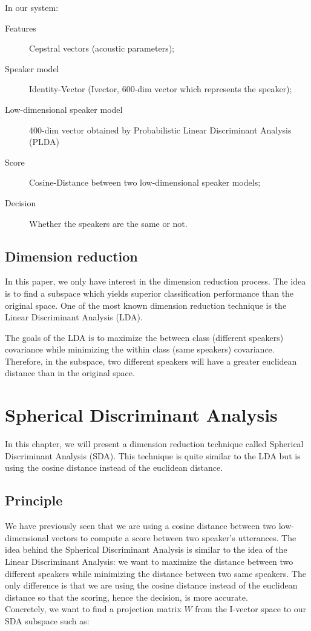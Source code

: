 \documentclass{techrep} %
\begin{document}
In our system:
\begin{description}
\item[Features] Cepstral vectors (acoustic parameters);
\item[Speaker model] Identity-Vector (Ivector, 600-dim vector which
  represents the speaker);
\item[Low-dimensional speaker model] 400-dim vector obtained by
  Probabilistic Linear Discriminant Analysis (PLDA)
\item[Score] Cosine-Distance between two low-dimensional speaker models;
\item[Decision] Whether the speakers are the same or not.
\end{description}

\section{Dimension reduction}

In this paper, we only have interest in the dimension reduction
process. The idea is to find a subspace which yields superior
classification performance than the original space. One of the most
known dimension reduction technique is the Linear Discriminant
Analysis (LDA).

The goals of the LDA is to maximize the between class (different
speakers) covariance while minimizing the within class (same speakers)
covariance. Therefore, in the subspace, two different speakers will
have a greater euclidean distance than in the original space.

\chapter{Spherical Discriminant Analysis}

In this chapter, we will present a dimension reduction technique
called Spherical Discriminant Analysis (SDA). This technique is quite
similar to the LDA but is using the cosine distance instead of the
euclidean distance.

\newcommand{\argmax}[1]{\smash{\mathop{{\rm argmax}}\limits_{W}}\, #1}
\newcommand{\argmin}[1]{\smash{\mathop{{\rm argmin}}\limits_{W}}\, #1}

\section{Principle}

We have previously seen that we are using a cosine distance between
two low-dimensional vectors to compute a score between two speaker's
utterances. The idea behind the Spherical Discriminant Analysis is
similar to the idea of the Linear Discriminant Analysis: we want to
maximize the distance between two different speakers while minimizing
the distance between two same speakers. The only difference is that we
are using the cosine distance instead of the euclidean distance so
that the scoring, hence the decision, is more accurate.\\ Concretely,
we want to find a projection matrix $W$ from the I-vector space to our
SDA subspace such as:
\end{document}
